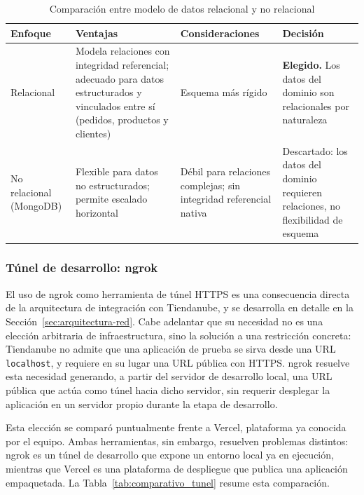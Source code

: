 \FloatBarrier

\begin{table}[h]
\centering
\caption{Comparación entre modelo de datos relacional y no relacional}
\label{tab:comparativo_db_enfoque}
\renewcommand{\arraystretch}{1.3}
\begin{tabular}{|m{2.3cm}|m{4.4cm}|m{4.4cm}|m{3.4cm}|}
\hline
\textbf{Enfoque} & \textbf{Ventajas} & \textbf{Consideraciones} & \textbf{Decisión} \\
\hline
Relacional & Modela relaciones con integridad referencial; adecuado para datos estructurados y vinculados entre sí (pedidos, productos y clientes) & Esquema más rígido & \textbf{Elegido.} Los datos del dominio son relacionales por naturaleza \\
\hline
No relacional (MongoDB) & Flexible para datos no estructurados; permite escalado horizontal & Débil para relaciones complejas; sin integridad referencial nativa & Descartado: los datos del dominio requieren relaciones, no flexibilidad de esquema \\
\hline
\end{tabular}
\end{table}

\subsubsection{Túnel de desarrollo: ngrok}
\label{sec:tunel-ngrok}

El uso de ngrok como herramienta de túnel HTTPS es una consecuencia directa de la arquitectura de integración con Tiendanube, y se desarrolla en detalle en la Sección~\ref{sec:arquitectura-red}. Cabe adelantar que su necesidad no es una elección arbitraria de infraestructura, sino la solución a una restricción concreta: Tiendanube no admite que una aplicación de prueba se sirva desde una URL \texttt{localhost}, y requiere en su lugar una URL pública con HTTPS. ngrok resuelve esta necesidad generando, a partir del servidor de desarrollo local, una URL pública que actúa como túnel hacia dicho servidor, sin requerir desplegar la aplicación en un servidor propio durante la etapa de desarrollo.

Esta elección se comparó puntualmente frente a Vercel, plataforma ya conocida por el equipo. Ambas herramientas, sin embargo, resuelven problemas distintos: ngrok es un túnel de desarrollo que expone un entorno local ya en ejecución, mientras que Vercel es una plataforma de despliegue que publica una aplicación empaquetada. La Tabla~\ref{tab:comparativo_tunel} resume esta comparación.

